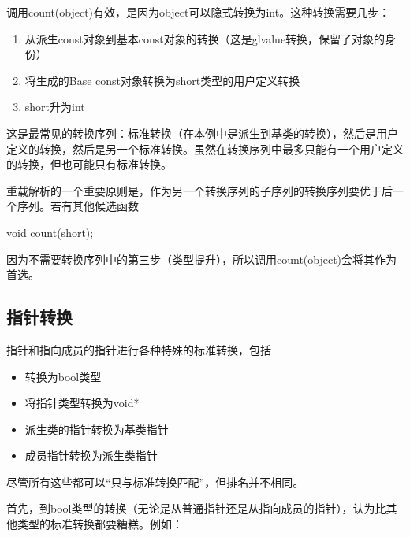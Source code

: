 调用count(object)有效，是因为object可以隐式转换为int。这种转换需要几步：

\begin{enumerate}
\item 
从派生const对象到基本const对象的转换（这是glvalue转换，保留了对象的身份）

\item 
将生成的Base const对象转换为short类型的用户定义转换

\item 
short升为int
\end{enumerate}

这是最常见的转换序列：标准转换（在本例中是派生到基类的转换），然后是用户定义的转换，然后是另一个标准转换。虽然在转换序列中最多只能有一个用户定义的转换，但也可能只有标准转换。

重载解析的一个重要原则是，作为另一个转换序列的子序列的转换序列要优于后一个序列。若有其他候选函数

\begin{cpp}
void count(short);
\end{cpp}

因为不需要转换序列中的第三步（类型提升），所以调用count(object)会将其作为首选。

\subsection{指针转换}

指针和指向成员的指针进行各种特殊的标准转换，包括

\begin{itemize}
\item 
转换为bool类型

\item 
将指针类型转换为void*

\item 
派生类的指针转换为基类指针

\item 
成员指针转换为派生类指针
\end{itemize}

尽管所有这些都可以“只与标准转换匹配”，但排名并不相同。

首先，到bool类型的转换（无论是从普通指针还是从指向成员的指针），认为比其他类型的标准转换都要糟糕。例如：



